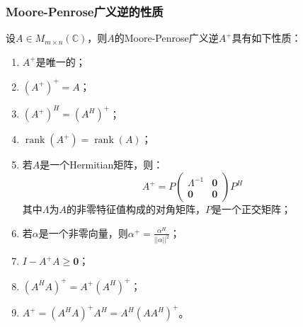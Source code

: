 \subsubsection{Moore-Penrose广义逆的性质}
\begin{property}\label{prop:A+}
	设$A\in M_{m\times n}(\mathbb{C})$，则$A$的Moore-Penrose广义逆$A^+$具有如下性质：
	\begin{enumerate}
		\item $A^+$是唯一的；
		\item $(A^+)^+=A$；
		\item $(A^+)^H=(A^H)^+$；
		\item $\operatorname{rank}(A^+)=\operatorname{rank}(A)$；
		\item 若$A$是一个Hermitian矩阵，则：
		\begin{equation*}
			A^+=P
			\begin{pmatrix}
				\varLambda^{-1} & \mathbf{0} \\
				\mathbf{0} & \mathbf{0}
			\end{pmatrix}P^H
		\end{equation*}
		其中$\varLambda$为$A$的非零特征值构成的对角矩阵，$P$是一个正交矩阵；
		\item 若$\alpha$是一个非零向量，则$\alpha^+=\frac{\alpha^H}{||\alpha||^2}$；
		\item $I-A^+A\geqslant \mathbf{0}$；
		\item $(A^HA)^+=A^+(A^H)^+$；
		\item $A^+=(A^HA)^+A^H=A^H(AA^H)^+$。
	\end{enumerate}
\end{property}
